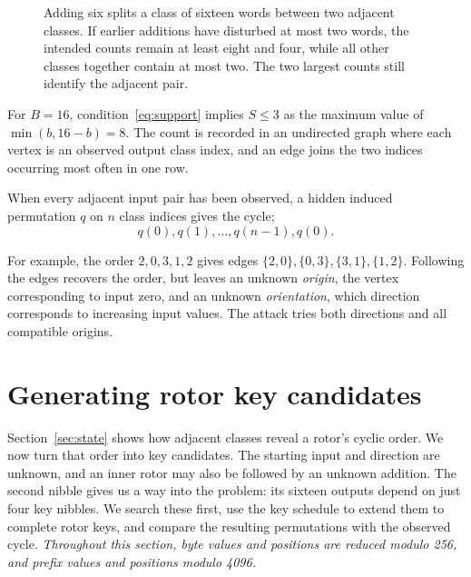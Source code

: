 \documentclass[11pt]{article}
\begin{document}
\begin{figure}[htbp]
\centering
{}
\caption{Adding six splits a class of sixteen words between two adjacent
classes. If earlier additions have disturbed at most two words, the
intended counts remain at least eight and four, while all other classes
together contain at most two. The two largest counts still identify
the adjacent pair.}
\label{fig:carry}
\end{figure}

For \(B=16\), condition~\eqref{eq:support} implies \(S\le3\) as the maximum value of $\min({b, 16 - b}) = 8$.
The count is recorded in an undirected graph where each vertex is an observed
output class index, and an edge joins the two indices occurring
most often in one row.

When every adjacent input pair has been observed, a hidden induced
permutation \(q\) on \(n\) class indices gives the cycle;
\[
                 q(0),q(1),\ldots,q(n-1),q(0).
\]

For example, the order \(2,0,3,1,2\) gives edges
\(\{2,0\},\{0,3\},\{3,1\},\{1,2\}\). Following the edges
recovers the order, but leaves an unknown \emph{origin}, the vertex
corresponding to input zero, and an unknown \emph{orientation}, which
direction corresponds to increasing input values. The attack tries
both directions and all compatible origins. 

\section{Generating rotor key candidates}\label{sec:decoder}
Section~\ref{sec:state} shows how adjacent classes reveal a rotor's cyclic
order. We now turn that order into key candidates. The starting input and
direction are unknown, and an inner rotor may also be followed by an
unknown addition. The second nibble gives us a way into the problem:
its sixteen outputs depend on just four key nibbles. We search these
first, use the key schedule to extend them to complete rotor keys, and
compare the resulting permutations with the observed cycle.
\textit{
Throughout this section, byte values and positions are reduced modulo
256, and prefix values and positions modulo 4096.}
\end{document}
